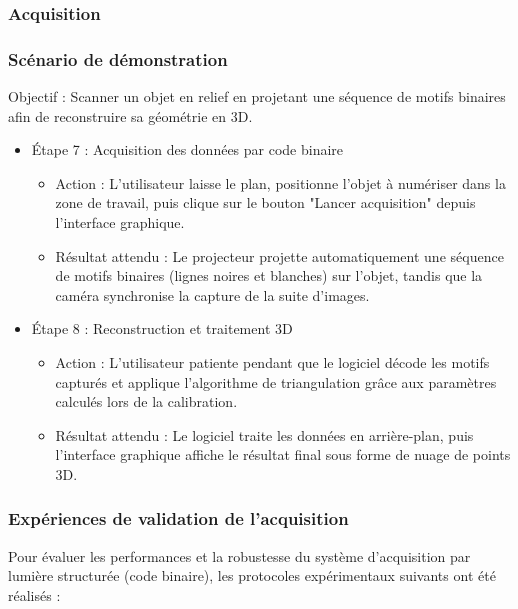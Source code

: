 \documentclass[10pt]{article} %
\begin{document}
\subsubsection{Acquisition}

\subsubsection*{Scénario de démonstration}

Objectif : Scanner un objet en relief en projetant une séquence de motifs binaires afin de reconstruire sa géométrie en 3D.

\begin{itemize}
\item{Étape 7 : Acquisition des données par code binaire}
\begin{itemize}
\item{Action : L'utilisateur laisse le plan, positionne l'objet à numériser dans la zone de travail, puis clique sur le bouton "Lancer acquisition" depuis l'interface graphique.}

    \item{Résultat attendu : Le projecteur projette automatiquement une séquence de motifs binaires (lignes noires et blanches) sur l'objet, tandis que la caméra synchronise la capture de la suite d'images.}
\end{itemize}

\item{Étape 8 : Reconstruction et traitement 3D}
\begin{itemize}
    \item{Action : L'utilisateur patiente pendant que le logiciel décode les motifs capturés et applique l'algorithme de triangulation grâce aux paramètres calculés lors de la calibration.}

    \item{Résultat attendu : Le logiciel traite les données en arrière-plan, puis l'interface graphique affiche le résultat final sous forme de nuage de points 3D.}
\end{itemize}
\end{itemize}

\subsubsection*{Expériences de validation de l'acquisition}

Pour évaluer les performances et la robustesse du système d'acquisition par lumière structurée (code binaire), les protocoles expérimentaux suivants ont été réalisés :
\end{document}
